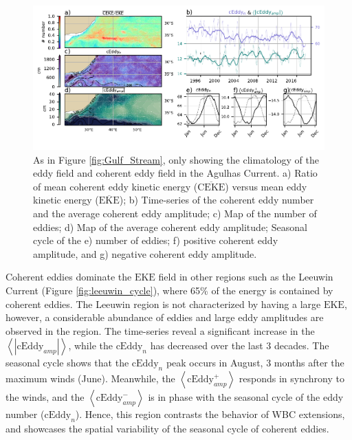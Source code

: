 \documentclass[draft,linenumbers]{agujournal2019}
\newcommand{\MEKE}{\overline{\textrm{EKE}}}
\newcommand{\EKE}{\textrm{EKE}}
\newcommand{\MCEKE}{\overline{\textrm{CEKE}}}
\newcommand{\cEddy}{\textrm{cEddy}}
\begin{document}
	\begin{figure}
	    \centering
	    \includegraphics[width=1\textwidth]{figures/regional_ratios_and_stats_V3_2.pdf}
	    \caption{As in Figure \ref{fig:Gulf_Stream}, only showing the  climatology of the eddy field and coherent eddy field in the Agulhas Current. a) Ratio of mean coherent eddy kinetic energy ($\MCEKE$) versus mean eddy kinetic energy ($\MEKE$); b) Time-series of the coherent eddy number and the average coherent eddy amplitude; c) Map of the number of eddies; d) Map of the average coherent eddy amplitude; Seasonal cycle of the e) number of eddies; f) positive coherent eddy amplitude, and g) negative coherent eddy amplitude.}
	    \label{fig:Agulhas}
	\end{figure}

	Coherent eddies dominate the $\EKE$ field in other regions such as the Leeuwin Current (Figure \ref{fig:leeuwin_cycle}), where 65\% of the energy is contained by coherent eddies. 
	The Leeuwin region is not characterized by having a large $\EKE$, however, a considerable abundance of eddies and large eddy amplitudes are observed in the region. 
	The time-series reveal a significant increase in the $\left<|\cEddy_{amp}|\right>$, while the $\cEddy_{n}$ has decreased over the last 3 decades. 
	The seasonal cycle shows that the $\cEddy_{n}$ peak occurs in August, 3 months after the maximum winds (June). 
	Meanwhile, the $\left<\cEddy_{amp}^+\right>$ responds in synchrony to the winds, and the $\left<\cEddy_{amp}^-\right>$ is in phase with the seasonal cycle of the eddy number ($\cEddy_{n}$). 
	Hence, this region contrasts the behavior of WBC extensions, and showcases the spatial variability of the seasonal cycle of coherent eddies.
 		
\end{document}
